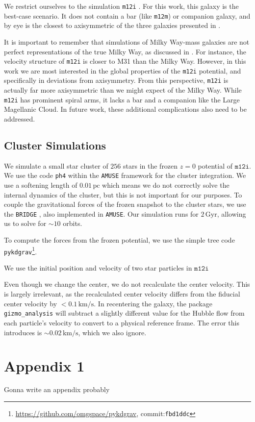 \documentclass[twocolumn]{aastex62}
\newcommand{\pc}{\text{pc}}
\newcommand{\Gyr}{\text{Gyr}}
\newcommand{\kms}{\text{km}/\text{s}}
\newcommand{\z}{z}
\begin{document}
We restrict ourselves to the simulation \texttt{m12i} \citep[first introduced
in][]{2016ApJ...827L..23W}. For this work, this galaxy is the best-case
scenario. It does not contain a bar (like \texttt{m12m}) or companion galaxy,
and by eye is the closest to axisymmetric of the three galaxies presented in
\citet{2018arXiv180610564S} \citep{2018MNRAS.481.4133G}.

It is important to remember that simulations of Milky Way-mass galaxies are
not perfect representations of the true Milky Way, as discussed in
\citet{2018arXiv180610564S}. For instance, the velocity structure of
\texttt{m12i} is closer to M31 than the Milky Way. However, in this work we
are most interested in the global properties of the \texttt{m12i} potential,
and specifically in deviations from axisymmetry. From this perspective,
\texttt{m12i} is actually far more axisymmetric than we might expect of the
Milky Way. While \texttt{m12i} has prominent spiral arms, it lacks a bar and
a companion like the Large Magellanic Cloud. In future work, these additional
complications also need to be addressed.

\subsection{Cluster Simulations} \label{ssec:cluster_sim}
We simulate a small star cluster of $256$ stars in the frozen $\z=0$
potential of $\texttt{m12i}$. We use the code \texttt{ph4} within the
\texttt{AMUSE} framework \citep{2011ascl.soft07007P, 2013CoPhC.184..456P,
2013A&A...557A..84P} for the cluster integration. We use a softening length
of $0.01\,\pc$ which means we do not correctly solve the internal dynamics of
the cluster, but this is not important for our purposes. To couple the
gravitational forces of the frozen snapshot to the cluster stars, we use the
\texttt{BRIDGE} \citep{2007PASJ...59.1095F}, also implemented in
\texttt{AMUSE}. Our simulation runs for $2\,\Gyr$, allowing us to solve for
$\sim 10$ orbits.

To compute the forces from the frozen potential, we use the simple tree code
\texttt{pykdgrav}\footnote{\url{https://github.com/omgspace/pykdgrav},
commit:\texttt{fbd1ddc}}. 

We use the initial position and velocity of two star particles in
$\texttt{m12i}$

Even though we change the center, we do not recalculate the center velocity.
This is largely irrelevant, as the recalculated center velocity differs from
the fiducial center velocity by $<0.1\,\kms$. In recentering the galaxy, the
package \texttt{gizmo\_analysis} will subtract a slightly different value for
the Hubble flow from each particle's velocity to convert to a physical
reference frame. The error this introduces is $\sim 0.02\,\kms$, which we also
ignore.

\appendix \section{Appendix 1}
Gonna write an appendix probably 


\end{document}
